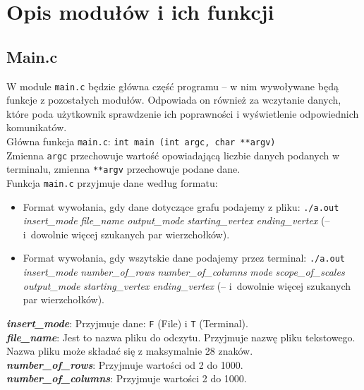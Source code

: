 \documentclass[12pt, a4paper]{article}
\begin{document}
\section{Opis modułów i ich funkcji}
\subsection{Main.c}
W module \texttt{main.c} będzie główna część programu -- w nim wywoływane będą funkcje z pozostałych modułów. Odpowiada on również za wczytanie danych, które poda użytkownik sprawdzenie ich poprawności i wyświetlenie odpowiednich komunikatów.\\

Główna funkcja \texttt{main.c}: \texttt{int main (int argc, char **argv)}\\
Zmienna \texttt{argc} przechowuje wartość opowiadającą liczbie danych podanych w terminalu, zmienna \texttt{**argv} przechowuje podane dane.\\

Funkcja \texttt{main.c} przyjmuje dane według formatu:
\begin{itemize}
\item Format wywołania, gdy dane dotyczące grafu podajemy z pliku: \texttt{./a.out} \textit{insert\_mode} \textit{file\_name} \textit{output\_mode} \textit{starting\_vertex} \textit{ending\_vertex} (-- i~dowolnie więcej szukanych par wierzchołków).
\item Format wywołania, gdy wszytskie dane podajemy przez terminal: \texttt{./a.out} \textit{insert\_mode} \textit{number\_of\_rows} \textit{number\_of\_columns} \textit{mode} \textit{scope\_of\_scales} \textit{output\_mode} \textit{starting\_vertex} \textit{ending\_vertex} (-- i~dowolnie więcej szukanych par wierzchołków).
\end{itemize}

\textbf{\textit{insert\_mode}}: Przyjmuje dane: \texttt{F} (File) i \texttt{T} (Terminal).\\

\textbf{\textit{file\_name}}: Jest to nazwa pliku do odczytu. Przyjmuje nazwę pliku tekstowego. Nazwa pliku może składać się z maksymalnie 28 znaków.\\

\textbf{\textit{number\_of\_rows}}: Przyjmuje wartości od 2 do 1000.\\

\textbf{\textit{number\_of\_columns}}: Przyjmuje wartości 2 do 1000.\\
\end{document}
